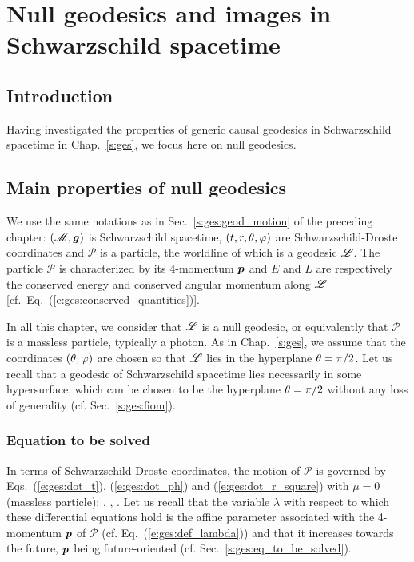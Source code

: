 \chapter{Null geodesics and images in Schwarzschild spacetime}
\label{s:gis}

\minitoc

\section{Introduction}

Having investigated the properties of generic causal geodesics
in Schwarzschild spacetime in Chap.~\ref{s:ges}, we focus here on null
geodesics.



\section{Main properties of null geodesics} \label{s:ges:null}

We use the same notations as in Sec.~\ref{s:ges:geod_motion} of the preceding
chapter: $(\mathscr{M}, \bm{g})$ is Schwarzschild spacetime, $(t,r,\theta,\varphi)$ are
Schwarzschild-Droste coordinates and
$\mathscr{P}$ is a particle, the worldline of which is a
geodesic $\mathscr{L}$. The particle $\mathscr{P}$ is characterized by its
4-momentum $\bm{p}$ and
$E$ and $L$ are respectively the conserved energy and conserved angular momentum
along $\mathscr{L}$ [cf.~Eq.~(\ref{e:ges:conserved_quantities})].


In all this chapter, we consider that $\mathscr{L}$ is a null geodesic, or equivalently that
$\mathscr{P}$ is a massless particle, typically a photon.
As in Chap.~\ref{s:ges}, we assume that the coordinates $(\theta,\varphi)$ are chosen
so that $\mathscr{L}$ lies in the hyperplane $\theta=\pi/2$. Let us recall that
a geodesic of Schwarzschild spacetime lies necessarily in some hypersurface, which
can be chosen to be the hyperplane $\theta=\pi/2$ without any loss of generality
(cf. Sec.~\ref{s:ges:fiom}).

\subsection{Equation to be solved}

In terms of Schwarzschild-Droste coordinates, the motion of $\mathscr{P}$ is governed by Eqs.~(\ref{e:ges:dot_t}), (\ref{e:ges:dot_ph}) and (\ref{e:ges:dot_r_square})
with $\mu=0$ (massless particle):
\be \label{e:ges:dot_t_null}
    ,
\ee
\be \label{e:ges:dot_ph_null}
   ,
\ee
\be \label{e:ges:dot_r_square_null}
   .
\ee
Let us recall that the variable $\lambda$ with respect to which these differential equations
hold
is the affine parameter associated with the 4-momentum $\bm{p}$ of $\mathscr{P}$
(cf. Eq.~(\ref{e:ges:def_lambda})) and that it increases towards the future,
$\bm{p}$ being future-oriented (cf. Sec.~\ref{s:ges:eq_to_be_solved}).

